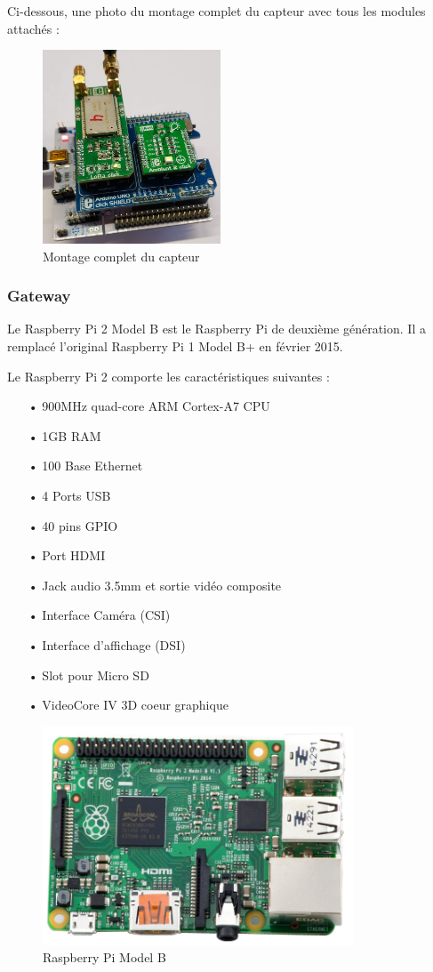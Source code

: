 \documentclass[12pt]{article}
\begin{document}
Ci-dessous, une photo du montage complet du capteur avec tous les modules attachés :
\begin{figure}[!h]
	\centering
	\includegraphics[width=200px]{montage}
	\caption{Montage complet du capteur}
	\label{}
\end{figure}

\newpage
\subsubsection{Gateway}

Le Raspberry Pi 2 Model B est le Raspberry Pi de deuxième génération. Il a remplacé l'original Raspberry Pi 1 Model B+ en février 2015.

Le Raspberry Pi 2 comporte les caractéristiques suivantes :

\begin{itemize}
	\item[•] 900MHz quad-core ARM Cortex-A7 CPU
	\item[•] 1GB RAM
	\item[•] 100 Base Ethernet
	\item[•] 4 Ports USB
	\item[•] 40 pins GPIO
	\item[•] Port HDMI
	\item[•] Jack audio 3.5mm et sortie vidéo composite
	\item[•] Interface Caméra (CSI)
	\item[•] Interface d'affichage (DSI)
	\item[•] Slot pour Micro SD
	\item[•] VideoCore IV 3D coeur graphique
\end{itemize}



\begin{figure}[!h]
	\centering
	\includegraphics[width=350px]{raspberry}
	\caption{Raspberry Pi Model B}
	\label{raspberry}
\end{figure}
\end{document}
